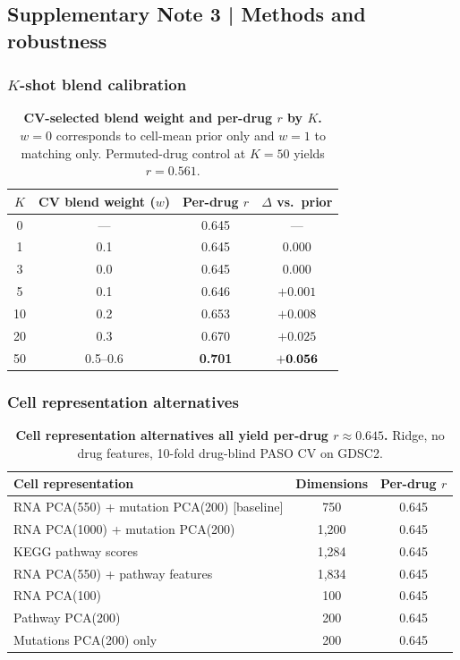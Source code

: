 \subsection*{Supplementary Note 3 | Methods and robustness}

\subsubsection*{$K$-shot blend calibration}

\begin{table}[htbp]
\centering
\caption{\textbf{CV-selected blend weight and per-drug $r$ by $K$.} $w = 0$ corresponds to cell-mean prior only and $w = 1$ to matching only. Permuted-drug control at $K = 50$ yields $r = 0.561$.}
\label{tab:kshot_curve}
\begin{tabular}{cccc}
\toprule
$K$ & CV blend weight ($w$) & Per-drug $r$ & $\Delta$ vs.\ prior \\
\midrule
0  & ---  & 0.645 & --- \\
1  & 0.1  & 0.645 & $0.000$ \\
3  & 0.0  & 0.645 & $0.000$ \\
5  & 0.1  & 0.646 & $+0.001$ \\
10 & 0.2  & 0.653 & $+0.008$ \\
20 & 0.3  & 0.670 & $+0.025$ \\
50 & 0.5--0.6 & \textbf{0.701} & $\mathbf{+0.056}$ \\
\bottomrule
\end{tabular}
\end{table}

\subsubsection*{Cell representation alternatives}

\begin{table}[htbp]
\centering
\caption{\textbf{Cell representation alternatives all yield per-drug $r \approx 0.645$.} Ridge, no drug features, 10-fold drug-blind PASO CV on GDSC2.}
\label{tab:cell_repr}
\begin{tabular}{lcc}
\toprule
Cell representation & Dimensions & Per-drug $r$ \\
\midrule
RNA PCA(550) + mutation PCA(200) [baseline] & 750 & 0.645 \\
RNA PCA(1000) + mutation PCA(200) & 1,200 & 0.645 \\
KEGG pathway scores & 1,284 & 0.645 \\
RNA PCA(550) + pathway features & 1,834 & 0.645 \\
RNA PCA(100) & 100 & 0.645 \\
Pathway PCA(200) & 200 & 0.645 \\
Mutations PCA(200) only & 200 & 0.645 \\
\bottomrule
\end{tabular}
\end{table}

